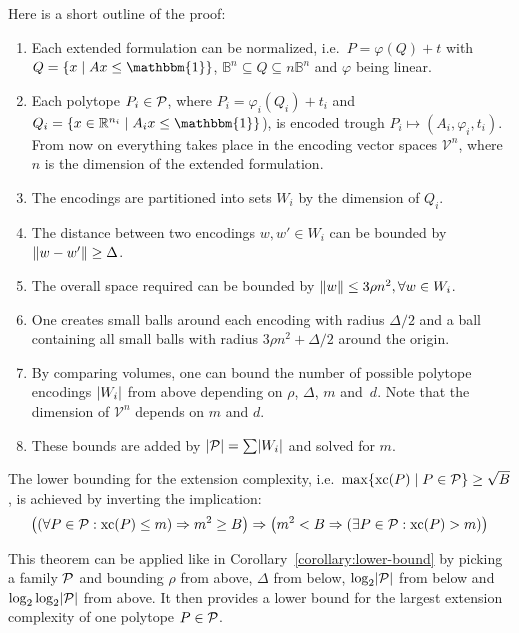 Here is a short outline of the proof:
\begin{enumerate}
  \item Each extended formulation can be normalized, i.e.\ $P = \varphi(Q) + t$ with\\ $Q = \{ x \mid Ax \leq \mathbbm{1} \}$, $\mathbb{B}^n \subseteq Q \subseteq n\mathbb{B}^n$ and $\varphi$ being linear.
  \item Each polytope $P_i \in \P$, where $P_i = \varphi_i(Q_i) + t_i$ and $Q_i = \{ x \in \R^{n_i} \mid A_ix \leq \mathbbm{1} \}$), is encoded trough $P_i \mapsto (A_i, \varphi_i, t_i)$.\\
        From now on everything takes place in the encoding vector spaces $\mathcal{V}^n$, where $n$ is the dimension of the extended formulation.
  \item The encodings are partitioned into sets $W_i$ by the dimension of $Q_i$.
  \item The distance between two encodings $w, w' \in W_i$ can be bounded by $\norm{w - w'} \geq \Delta$.
  \item The overall space required can be bounded by $\norm{w} \leq 3\rho n^2, \forall w \in W_i$.
  \item One creates small balls around each encoding with radius $\Delta/2$ and a ball containing all small balls with radius $3\rho n^2 + \Delta/2$ around the origin.
  \item By comparing volumes, one can bound the number of possible polytope encodings $\abs{W_i}$ from above depending on $\rho$, $\Delta$, $m$ and~$d$. Note that the dimension of $\mathcal{V}^n$ depends on $m$ and $d$.
  \item These bounds are added by $\abs{\P} = \sum \abs{W_i}$ and solved for $m$.
\end{enumerate}

The lower bounding for the extension complexity, i.e.\ $\max \{\xc(P) \mid P \in \P\}  \geq \sqrt{B}$, is achieved by inverting the implication:
$$ \left( \left( \forall P\in\P: \xc(P) \leq m \right) \Rightarrow m^2 \geq B \right) \Rightarrow \left( m^2 < B \Rightarrow \left( \exists P\in\P: \xc(P) > m \right) \right) $$

This theorem can be applied like in Corollary~\ref{corollary:lower-bound} by picking a family $\P$ and bounding $\rho$ from above, $\Delta$ from below, $\log_2 \abs{\P}$ from below and $\log_2\log_2 \abs{\P}$ from above. It then provides a lower bound for the largest extension complexity of one polytope $P \in \P$.

